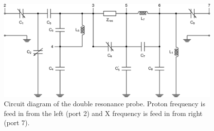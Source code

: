 \documentclass[preprint,12pt]{article}
\begin{document}
\begin{figure}
\centering
\includegraphics[width=\linewidth,keepaspectratio=true]{./figures/ms5n17-tlp-im-180110-circuit-diagram.png}
\caption{Circuit diagram of the double resonance probe. Proton frequency is feed in from the left (port 2) and X frequency is feed in from right (port 7).}
\label{fig:circuit}
\end{figure}
\end{document}
